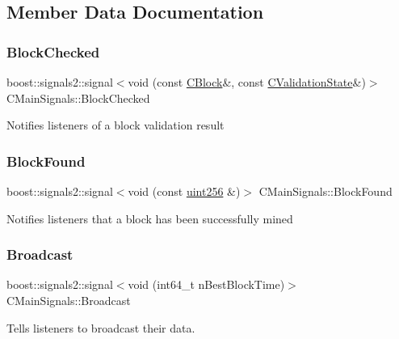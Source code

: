 \subsection{Member Data Documentation}
\mbox{\label{struct_c_main_signals_a9419bb09211f46bdc7f214e9d94f1bd7}} 
\subsubsection{\texorpdfstring{Block\+Checked}{BlockChecked}}
{\footnotesize\ttfamily boost\+::signals2\+::signal$<$void (const \mbox{\hyperlink{class_c_block}{C\+Block}}\&, const \mbox{\hyperlink{class_c_validation_state}{C\+Validation\+State}}\&)$>$ C\+Main\+Signals\+::\+Block\+Checked}

Notifies listeners of a block validation result \mbox{\label{struct_c_main_signals_a27cc5668c440a9d451f7f661370dbc61}} 
\subsubsection{\texorpdfstring{Block\+Found}{BlockFound}}
{\footnotesize\ttfamily boost\+::signals2\+::signal$<$void (const \mbox{\hyperlink{classuint256}{uint256}} \&)$>$ C\+Main\+Signals\+::\+Block\+Found}

Notifies listeners that a block has been successfully mined \mbox{\label{struct_c_main_signals_a57ba54e641838bc03d0bbda30796c0c9}} 
\subsubsection{\texorpdfstring{Broadcast}{Broadcast}}
{\footnotesize\ttfamily boost\+::signals2\+::signal$<$void (int64\+\_\+t n\+Best\+Block\+Time)$>$ C\+Main\+Signals\+::\+Broadcast}

Tells listeners to broadcast their data. \mbox{\label{struct_c_main_signals_a2f8f94d91265dc946e97614042698a7b}} 
